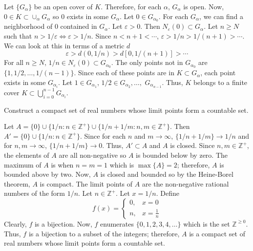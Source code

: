 \begin{exercise}
  \par\smallskip
  Let \(\{G_{\alpha}\}\) be an open cover of \(K\).
  Therefore, for each \(\alpha\), \(G_{\alpha}\) is open.
  Now, \(0\in K\subset\cup_{\alpha}G_{\alpha}\) so \(0\) exists in some
  \(G_{\alpha}\).
  Let \(0\in G_{\alpha_0}\).
  For each \(G_{\alpha}\), we can find a neighborhood of \(0\) contained in
  \(G_{\alpha}\).
  Let \(\varepsilon > 0\).
  Then \(N_{\varepsilon}(0)\subset G_{\alpha}\).
  Let \(n\geq N\) such that \(n > 1/\varepsilon\iff\varepsilon > 1/n\).
  Since \(n < n + 1 < \cdots\), \(\varepsilon > 1/n > 1/(n + 1) > \cdots\).
  We can look at this in terms of a metric \(d\)
  \[
  \varepsilon > d(0, 1/n) > d[0, 1/(n + 1)] > \cdots
  \]
  For all \(n\geq N\), \(1/n\in N_{\varepsilon}(0)\subset G_{\alpha_0}\).
  The only points not in \(G_{\alpha_0}\) are \(\{1,1/2,\ldots,1/(n - 1)\}\).
  Since each of these points are in \(K\subset G_{\alpha}\), each point exists
  in some \(G_{\alpha_i}\).
  Let \(1\in G_{\alpha_1}\), \(1/2\in G_{\alpha_2},\ldots,\)
  \(G_{\alpha_{n - 1}}\).
  Thus, \(K\) belongs to a finite cover
  \(K\subset\bigcup_{i = 0}^{n - 1}G_{\alpha_i}\).
\item
  Construct a compact set of real numbers whose limit points form a countable
  set.
  \par\smallskip
  Let \(A = \{0\}\cup\{1/n\colon n\in\mathbb{Z}^+\}\cup
  \{1/n + 1/m\colon n,m\in\mathbb{Z}^+\}\).
  Then \(A' = \{0\}\cup\{1/n\colon n\in\mathbb{Z}^+\}\).
  Since for each \(n\) and \(m\to\infty\), \(\{1/n + 1/m\}\to 1/n\) and
  for \(n,m\to\infty\), \(\{1/n + 1/m\}\to 0\).
  Thus, \(A'\subset A\) and \(A\) is closed.
  Since \(n,m\in\mathbb{Z}^+\), the elements of \(A\) are all non-negative so
  \(A\) is bounded below by zero.
  The maximum of \(A\) is when \(n = m = 1\) which is \(\max\{A\} = 2\);
  therefore, \(A\) is bounded above by two.
  Now, \(A\) is closed and bounded so by the Heine-Borel theorem, \(A\) is
  compact.
  The limit points of \(A\) are the non-negative rational numbers of the form
  \(1/n\).
  Let \(n\in\mathbb{Z}^+\).
  Let \(x = 1/n\).
  Define
  \[
  f(x) =
  \begin{cases}
    0, & x = 0\\
    n, & x = \frac{1}{n}
  \end{cases}
  \]
  Clearly, \(f\) is a bijection.
  Now, \(f\) enumerates \(\{0,1,2,3,4,\ldots\}\) which is the set
  \(\mathbb{Z}^{\geq 0}\).
  Thus, \(f\) is a bijection to a subset of the integers; therefore, \(A\) is
  a compact set of real numbers whose limit points form a countable set.

\end{exercise}
